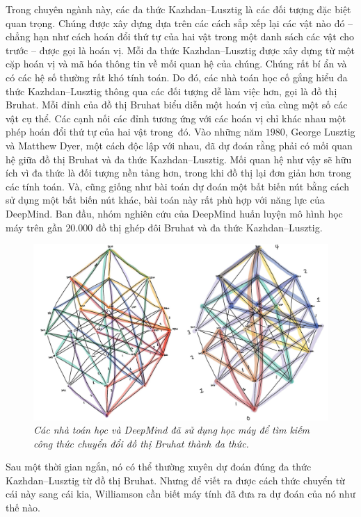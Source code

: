\begin{multicols}{2}
	\vskip 0.05cm
	Trong chuyên ngành này, các đa thức Kazhdan--Lusztig là các đối tượng đặc biệt quan trọng. Chúng được xây dựng dựa trên các cách sắp xếp lại các vật nào đó -- chẳng hạn như cách hoán đổi thứ tự của hai vật trong một danh sách các vật cho trước -- được gọi là hoán vị. Mỗi đa thức Kazhdan--Lusztig được xây dựng từ một cặp hoán vị và mã hóa thông tin về mối quan hệ của chúng. Chúng rất bí ẩn và có các hệ số thường rất khó tính toán.
	\vskip 0.05cm
	Do đó, các nhà toán học cố gắng hiểu đa thức Kazhdan--Lusztig thông qua các đối tượng dễ làm việc hơn, gọi là đồ thị Bruhat. Mỗi đỉnh của đồ thị Bruhat biểu diễn một hoán vị của cùng một số các vật cụ thể. Các cạnh nối các đỉnh tương ứng với các hoán vị chỉ khác nhau một phép hoán đổi thứ tự của hai vật trong~đó.
	\vskip 0.05cm
	Vào những năm $1980$, George Lusztig và Matthew Dyer, một cách độc lập với nhau, đã dự đoán rằng phải có mối quan hệ giữa đồ thị Bruhat và đa thức Kazhdan--Lusztig. Mối quan hệ như vậy sẽ hữu ích vì đa thức là đối tượng nền tảng hơn, trong khi đồ thị lại đơn giản hơn trong các tính toán.
	\vskip 0.05cm
	Và, cũng giống như bài toán dự đoán một bất biến nút bằng cách sử dụng một bất biến nút khác, bài toán này rất phù hợp với năng lực của DeepMind. Ban đầu, nhóm nghiên cứu của DeepMind huấn luyện mô hình học máy trên gần $20{.}000$ đồ thị ghép đôi Bruhat và đa thức Kazhdan--Lusztig.
	\begin{figure}[H]
		\centering
		\vspace*{-10pt}
		\captionsetup{labelformat= empty, justification=centering}
		\includegraphics[width=0.85\linewidth]{5}
		\caption{\small\textit{\color{duongvaotoanhoc}Các nhà toán học và DeepMind đã sử dụng học máy để tìm kiếm công thức chuyển đổi đồ thị Bruhat thành đa thức.}}
		\vspace*{-10pt}
	\end{figure}
	Sau một thời gian ngắn, nó có thể thường xuyên dự đoán đúng đa thức Kazhdan--Lusztig từ đồ thị Bruhat. Nhưng để viết ra được cách thức chuyển từ cái này sang cái kia, Williamson cần biết máy tính đã đưa ra dự đoán của nó như thế nào.

\end{multicols}
